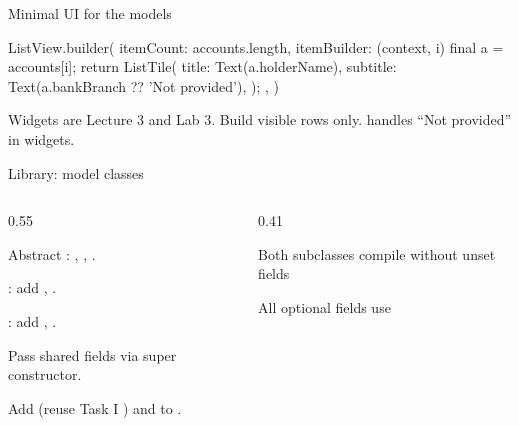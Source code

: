 \documentclass[10pt,aspectratio=169,t]{beamer}
\begin{document}
\begin{frame}[fragile,eyebrow=Scaffolding]{Minimal UI for the models}
\begin{dart}
ListView.builder(
  itemCount: accounts.length,
  itemBuilder: (context, i) {
    final a = accounts[i];
    return ListTile(
      title: Text(a.holderName),
      subtitle: Text(a.bankBranch ?? 'Not provided'),
    );
  },
)
\end{dart}
  \begin{takeaway}{Widgets are Lecture 3 and Lab 3.}
    Build visible rows only.  handles ``Not provided'' in widgets.
  \end{takeaway}
\end{frame}

\begin{frame}[eyebrow=Task III]{Library: model classes}
  {\small
  \begin{columns}[T]
    \begin{column}{0.55\textwidth}
      \begin{steps}
        \item Abstract : , , .
        \item {}: add , .
        \item {}: add , .
        \item Pass shared fields via super constructor.
        \item Add  (reuse Task I ) and  to .
      \end{steps}
    \end{column}
    \begin{column}{0.41\textwidth}
      \begin{checklist}
        \item Both subclasses compile without unset fields
        \item All optional fields use 
      \end{checklist}
    \end{column}
  \end{columns}
  }
\end{frame}
\end{document}
